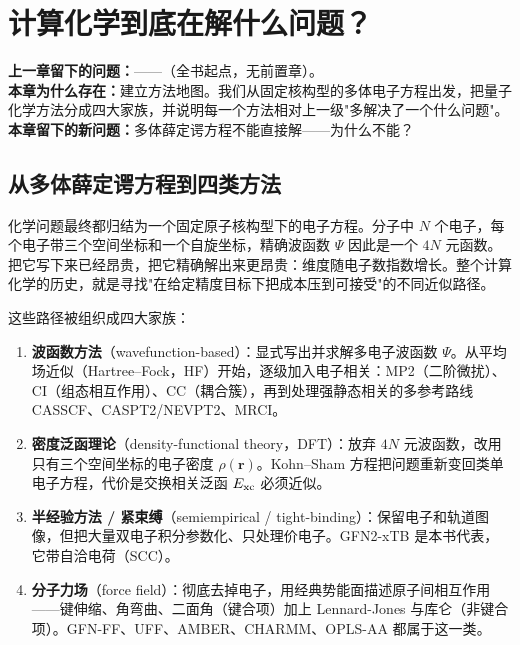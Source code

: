 
\section{计算化学到底在解什么问题？}
\label{ch:01:sec:title}

\begin{problemchain}
\textbf{上一章留下的问题：}——（全书起点，无前置章）。\\
\textbf{本章为什么存在：}建立方法地图。我们从固定核构型的多体电子方程出发，把量子化学方法分成四大家族，并说明每一个方法相对上一级"多解决了一个什么问题"。\\
\textbf{本章留下的新问题：}多体薛定谔方程不能直接解——为什么不能？
\end{problemchain}

\subsection{从多体薛定谔方程到四类方法}
\label{ch:01:sec:four-families}

化学问题最终都归结为一个固定原子核构型下的电子方程。分子中 $N$ 个电子，每个电子带三个空间坐标和一个自旋坐标，精确波函数 $\Psi$ 因此是一个 $4N$ 元函数。把它写下来已经昂贵，把它精确解出来更昂贵：维度随电子数指数增长。整个计算化学的历史，就是寻找"在给定精度目标下把成本压到可接受"的不同近似路径\citep{szabo1996,jensen2017}。

这些路径被组织成四大家族：

\begin{enumerate}
  \item \textbf{波函数方法}（wavefunction-based）：显式写出并求解多电子波函数 $\Psi$。从平均场近似（Hartree--Fock，HF）开始，逐级加入电子相关：MP2（二阶微扰）、CI（组态相互作用）、CC（耦合簇），再到处理强静态相关的多参考路线 CASSCF、CASPT2/NEVPT2、MRCI\citep{szabo1996,helgaker2000}。
  \item \textbf{密度泛函理论}（density-functional theory，DFT）：放弃 $4N$ 元波函数，改用只有三个空间坐标的电子密度 $\rho(\mathbf{r})$。Kohn--Sham 方程把问题重新变回类单电子方程，代价是交换相关泛函 $E_{\mathrm{xc}}$ 必须近似\citep{parr1989}。
  \item \textbf{半经验方法 / 紧束缚}（semiempirical / tight-binding）：保留电子和轨道图像，但把大量双电子积分参数化、只处理价电子。GFN2-xTB 是本书代表，它带自洽电荷（SCC）\citep{bannwarth2019gfn2}。
  \item \textbf{分子力场}（force field）：彻底去掉电子，用经典势能面描述原子间相互作用——键伸缩、角弯曲、二面角（键合项）加上 Lennard-Jones 与库仑（非键合项）。GFN-FF、UFF、AMBER、CHARMM、OPLS-AA 都属于这一类\citep{spicher2020gfnff,rappe1992uff,cornell1995amber,jorgensen1996oplsaa}。
\end{enumerate}

